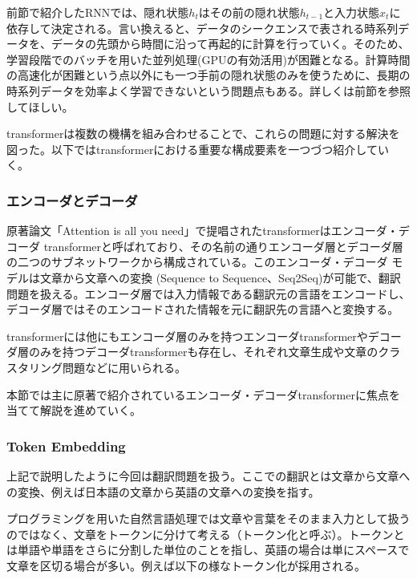 
前節で紹介したRNNでは、隠れ状態$h_t$はその前の隠れ状態$h_{t-1}$と入力状態$x_t$に依存して決定される。言い換えると、データのシークエンスで表される時系列データを、データの先頭から時間に沿って再起的に計算を行っていく。そのため、学習段階でのバッチを用いた並列処理(GPUの有効活用)が困難となる。計算時間の高速化が困難という点以外にも一つ手前の隠れ状態のみを使うために、長期の時系列データを効率よく学習できないという問題点もある。詳しくは前節を参照してほしい。

transformerは複数の機構を組み合わせることで、これらの問題に対する解決を図った。以下ではtransformerにおける重要な構成要素を一つづつ紹介していく。



\subsubsection{エンコーダとデコーダ}
原著論文「Attention is all you need」で提唱されたtransformerはエンコーダ・デコーダ transformerと呼ばれており、その名前の通りエンコーダ層とデコーダ層の二つのサブネットワークから構成されている。このエンコーダ・デコーダ モデルは文章から文章への変換 (Sequence to Sequence、Seq2Seq)が可能で、翻訳問題を扱える。エンコーダ層では入力情報である翻訳元の言語をエンコードし、デコーダ層ではそのエンコードされた情報を元に翻訳先の言語へと変換する。

transformerには他にもエンコーダ層のみを持つエンコーダtransformerやデコーダ層のみを持つデコーダtransformerも存在し、それぞれ文章生成や文章のクラスタリング問題などに用いられる。

本節では主に原著で紹介されているエンコーダ・デコーダtransformerに焦点を当てて解説を進めていく。


\subsubsection{Token Embedding}
上記で説明したように今回は翻訳問題を扱う。ここでの翻訳とは文章から文章への変換、例えば日本語の文章から英語の文章への変換を指す。

プログラミングを用いた自然言語処理では文章や言葉をそのまま入力として扱うのではなく、文章をトークンに分けて考える（トークン化と呼ぶ）。トークンとは単語や単語をさらに分割した単位のことを指し、英語の場合は単にスペースで文章を区切る場合が多い。例えば以下の様なトークン化が採用される。


